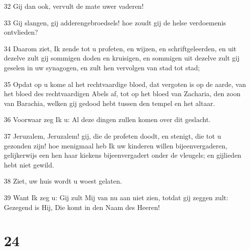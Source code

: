 \par 32 Gij dan ook, vervult de mate uwer vaderen!
\par 33 Gij slangen, gij adderengebroedsels! hoe zoudt gij de helse verdoemenis ontvlieden?
\par 34 Daarom ziet, Ik zende tot u profeten, en wijzen, en schriftgeleerden, en uit dezelve zult gij sommigen doden en kruisigen, en sommigen uit dezelve zult gij geselen in uw synagogen, en zult hen vervolgen van stad tot stad;
\par 35 Opdat op u kome al het rechtvaardige bloed, dat vergoten is op de aarde, van het bloed des rechtvaardigen Abels af, tot op het bloed van Zacharia, den zoon van Barachia, welken gij gedood hebt tussen den tempel en het altaar.
\par 36 Voorwaar zeg Ik u: Al deze dingen zullen komen over dit geslacht.
\par 37 Jeruzalem, Jeruzalem! gij, die de profeten doodt, en stenigt, die tot u gezonden zijn! hoe menigmaal heb Ik uw kinderen willen bijeenvergaderen, gelijkerwijs een hen haar kiekens bijeenvergadert onder de vleugels; en gijlieden hebt niet gewild.
\par 38 Ziet, uw huis wordt u woest gelaten.
\par 39 Want Ik zeg u: Gij zult Mij van nu aan niet zien, totdat gij zeggen zult: Gezegend is Hij, Die komt in den Naam des Heeren!

\chapter{24}

